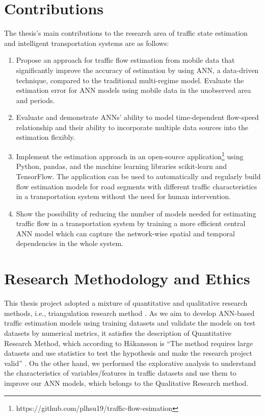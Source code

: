 \documentclass[english]{kththesis}
\begin{document}
\section{Contributions}
The thesis's main contributions to the research area of traffic state estimation and intelligent transportation systems are as follows:
\begin{enumerate}
    \item Propose an approach for traffic flow estimation from mobile data that significantly improve the accuracy of estimation by using ANN, a data-driven technique, compared to the traditional multi-regime model. Evaluate the estimation error for ANN models using mobile data in the unobserved area and periods.
    \item Evaluate and demonstrate ANNs' ability to model time-dependent flow-speed relationship and their ability to incorporate multiple data sources into the estimation flexibly.
    \item Implement the estimation approach in an open-source application\footnote{https://github.com/plhsu19/traffic-flow-esimation}  using Python, pandas, and the machine learning libraries scikit-learn and TensorFlow.  The application can be used to automatically and regularly build flow estimation models for road segments with different traffic characteristics in a transportation system without the need for human intervention.
    \item Show the possibility of reducing the number of models needed for estimating traffic flow in a transportation system by training a more efficient central ANN model which can capture the network-wise spatial and temporal dependencies in the whole system.
\end{enumerate}


\section{Research Methodology and Ethics}
This thesis project adopted a mixture of quantitative and qualitative research methods, i.e., triangulation research method \cite{hakansson_research_method}. As we aim to develop ANN-based traffic estimation models using training datasets and validate the models on test datasets by numerical metrics, it satisfies the description of Quantitative Research Method, which according to Håkansson is “The method requires large datasets and use statistics to test the hypothesis and make the research project valid” \cite{hakansson_research_method}. On the other hand, we performed the explorative analysis to understand the characteristics of variables/features in traffic datasets and use them to improve our ANN models, which belongs to the Qualitative Research method.
\end{document}
